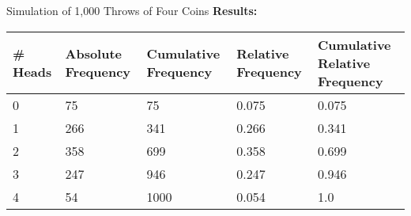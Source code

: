 \documentclass[handout]{beamer} %
\begin{document}
\begin{frame}{Simulation of 1,000 Throws of Four Coins}
    \textbf{Results:} 
    
    \vspace{1em}
    
{\small \centering
\begin{tabular}{|p{}|p{}|p{}|
                    p{}|p{}|}
    \hline
    \# Heads & Absolute Frequency & Cumulative Frequency & Relative Frequency & Cumulative Relative Frequency \\
    \hline
    0 & 75 & 75 & 0.075 & 0.075 \\
    1 & 266 & 341 & 0.266 & 0.341 \\
    2 & 358 & 699 & 0.358 & 0.699 \\
    3 & 247 & 946 & 0.247 & 0.946 \\
    4 & 54 & 1000 & 0.054 & 1.0 \\
    \hline
\end{tabular}
\par}

\end{frame}
\end{document}

